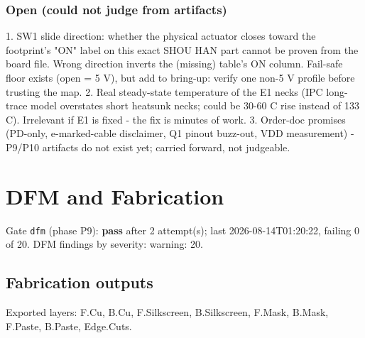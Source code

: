 \documentclass[11pt,a4paper]{article}
\begin{document}
\subsubsection*{Open (could not judge from artifacts)}
1. SW1 slide direction: whether the physical actuator closes toward the footprint's "ON" label on this exact SHOU HAN part cannot be proven from the board file. Wrong direction inverts the (missing) table's ON column. Fail-safe floor exists (open = 5 V), but add to bring-up: verify one non-5 V profile before trusting the map. 2. Real steady-state temperature of the E1 necks (IPC long-trace model overstates short heatsunk necks; could be 30-60 C rise instead of 133 C). Irrelevant if E1 is fixed - the fix is minutes of work. 3. Order-doc promises (PD-only, e-marked-cable disclaimer, Q1 pinout buzz-out, VDD measurement) - P9/P10 artifacts do not exist yet; carried forward, not judgeable.

\section{DFM and Fabrication}
Gate \texttt{dfm} (phase P9): \textbf{pass} after 2 attempt(s); last 2026-08-14T01:20:22, failing 0 of 20.
DFM findings by severity: warning: 20.
\subsection*{Fabrication outputs}
Exported layers: F.Cu, B.Cu, F.Silkscreen, B.Silkscreen, F.Mask, B.Mask, F.Paste, B.Paste, Edge.Cuts.
\end{document}

